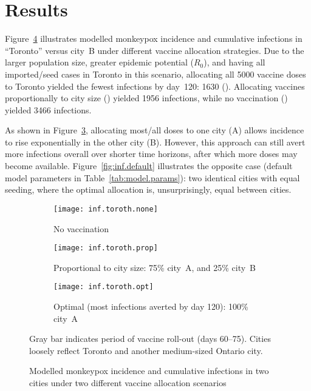\section{Results}
Figure~\ref{fig:toroth} illustrates modelled monkeypox incidence and cumulative infections
in ``Toronto'' versus city~B under different vaccine allocation strategies.
Due to the larger population size,
greater epidemic potential ($R_0$), and
having all imported/seed cases in Toronto in this scenario,
allocating all 5000 vaccine doses to Toronto
yielded the fewest infections by day~120: 1630 (). %
Allocating vaccines proportionally to city size () yielded 1956 infections, %
while no vaccination () yielded 3466 infections. %
\par
As shown in Figure~\ref{fig:inf.toroth.opt}, allocating most/all doses to one city (A)
allows incidence to rise exponentially in the other city (B).
However, this approach can still avert more infections overall over shorter time horizons,
after which more doses may become available.
Figure~\ref{fig:inf.default} illustrates the opposite case
(default model parameters in Table~\ref{tab:model.params}): two identical cities with equal seeding,
where the optimal allocation is, unsurprisingly, equal between cities.
\begin{figure}[h]
  \begin{subfigure}{\linewidth}
    \texttt{[image: inf.toroth.none]}
    \caption{No vaccination}
    \label{fig:inf.toroth.none}
  \end{subfigure}
  \begin{subfigure}{\linewidth}
    \texttt{[image: inf.toroth.prop]}
    \caption{Proportional to city size: 75\% city~A, and 25\% city~B}
    \label{fig:inf.toroth.prop}
  \end{subfigure}
  \begin{subfigure}{\linewidth}
    \texttt{[image: inf.toroth.opt]}
    \caption{Optimal (most infections averted by day 120): 100\% city~A}
    \label{fig:inf.toroth.opt}
  \end{subfigure}
  \caption{Modelled monkeypox incidence and cumulative infections in two cities
    under two different vaccine allocation scenarios}
  \label{fig:toroth}
  \floatfoot
  Gray bar indicates period of vaccine roll-out (days 60--75).
  Cities loosely reflect Toronto and another medium-sized Ontario city.
\end{figure}
